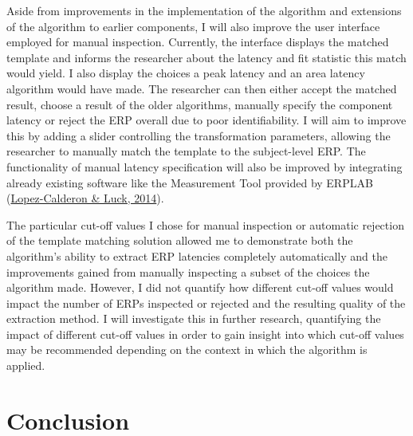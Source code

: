 \documentclass[
  man]{apa7}
\begin{document}
Aside from improvements in the implementation of the algorithm and extensions of the algorithm to earlier components, I will also improve the user interface employed for manual inspection. Currently, the interface displays the matched template and informs the researcher about the latency and fit statistic this match would yield. I also display the choices a peak latency and an area latency algorithm would have made. The researcher can then either accept the matched result, choose a result of the older algorithms, manually specify the component latency or reject the ERP overall due to poor identifiability. I will aim to improve this by adding a slider controlling the transformation parameters, allowing the researcher to manually match the template to the subject-level ERP. The functionality of manual latency specification will also be improved by integrating already existing software like the Measurement Tool provided by ERPLAB (\protect\hyperlink{ref-lopez2014erplab}{Lopez-Calderon \& Luck, 2014}).

The particular cut-off values I chose for manual inspection or automatic rejection of the template matching solution allowed me to demonstrate both the algorithm's ability to extract ERP latencies completely automatically and the improvements gained from manually inspecting a subset of the choices the algorithm made. However, I did not quantify how different cut-off values would impact the number of ERPs inspected or rejected and the resulting quality of the extraction method. I will investigate this in further research, quantifying the impact of different cut-off values in order to gain insight into which cut-off values may be recommended depending on the context in which the algorithm is applied.

\hypertarget{conclusion}{%
\section{Conclusion}\label{conclusion}}
\end{document}

